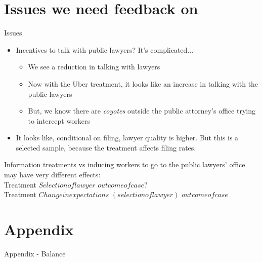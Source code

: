 \documentclass[8pt]{beamer}
\begin{document}
\section{Issues we need feedback on}
\begin{frame}{Issues}
    \begin{itemize}
        \item Incentives to talk with public lawyers? It's complicated...
       
    \begin{itemize}
        \item We see a reduction in talking with lawyers
        \item Now with the Uber treatment, it looks like an increase in talking with the public lawyers
        \item But, we know there are \textit{coyotes} outside the public attorney's office trying to intercept workers
        \end{itemize}
        
    \item It looks like, conditional on filing, lawyer quality is higher. But this is a selected sample, because the treatment affects filing rates.     \end{itemize}
    Information treatments vs inducing workers to go to the public lawyers' office may have very different effects:\\
    \vspace{.1in}
   Treatment \xrightarrow{} $Selection of lawyer$ \xrightarrow{} $outcome of case?$  \\
 
 \vspace{.1in}
    Treatment \xrightarrow{} $Change in expectations$ \xrightarrow{} $(selection of lawyer)$ \xrightarrow{} $outcome of case$
\end{frame}




\section{Appendix}

\begin{frame}{Appendix - Balance}
\begin{table}[H] 
 \begin{subtable}{1.\textwidth}
 \begin{center}
 \tiny{}
 \end{center}
 \end{subtable}
 \end{table}  
\end{frame}
\end{document}
